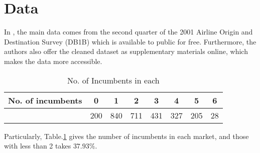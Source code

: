 \documentclass[a4paper]{article}
\begin{document}
\section{Data}

In \cite{ciliberto2009market}, the main data comes from the second quarter of the 2001 Airline Origin and Destination Survey (DB1B) which is available to public for free. Furthermore, the authors also offer the cleaned dataset as supplementary materials online, which makes the data more accessible. 

\begin{table}[h!]
\centering
\caption{No. of Incumbents in each }
\begin{tabular}{cccccccc} 
 \hline
 No. of incumbents & 0 & 1 & 2 & 3 & 4 & 5 & 6 \\ 
 \hline
 & 200 & 840 & 711 & 431 & 327 & 205 & 28 \\ 
 \hline
\end{tabular}
\label{no.of.icb}

\end{table}

Particularly, Table.\ref{no.of.icb} gives the number of incumbents in each market, and those with less than 2 takes $37.93\%$.




\end{document}
